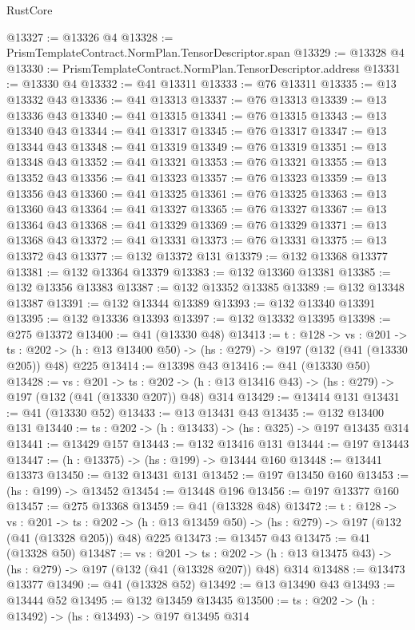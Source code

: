\begin{lexlean}{RustCore}
\begin{coremodule}
@13327 := @13326 @4
@13328 := PrismTemplateContract.NormPlan.TensorDescriptor.span
@13329 := @13328 @4
@13330 := PrismTemplateContract.NormPlan.TensorDescriptor.address
@13331 := @13330 @4
@13332 := @41 @13311
@13333 := @76 @13311
@13335 := @13 @13332 @43
@13336 := @41 @13313
@13337 := @76 @13313
@13339 := @13 @13336 @43
@13340 := @41 @13315
@13341 := @76 @13315
@13343 := @13 @13340 @43
@13344 := @41 @13317
@13345 := @76 @13317
@13347 := @13 @13344 @43
@13348 := @41 @13319
@13349 := @76 @13319
@13351 := @13 @13348 @43
@13352 := @41 @13321
@13353 := @76 @13321
@13355 := @13 @13352 @43
@13356 := @41 @13323
@13357 := @76 @13323
@13359 := @13 @13356 @43
@13360 := @41 @13325
@13361 := @76 @13325
@13363 := @13 @13360 @43
@13364 := @41 @13327
@13365 := @76 @13327
@13367 := @13 @13364 @43
@13368 := @41 @13329
@13369 := @76 @13329
@13371 := @13 @13368 @43
@13372 := @41 @13331
@13373 := @76 @13331
@13375 := @13 @13372 @43
@13377 := @132 @13372 @131
@13379 := @132 @13368 @13377
@13381 := @132 @13364 @13379
@13383 := @132 @13360 @13381
@13385 := @132 @13356 @13383
@13387 := @132 @13352 @13385
@13389 := @132 @13348 @13387
@13391 := @132 @13344 @13389
@13393 := @132 @13340 @13391
@13395 := @132 @13336 @13393
@13397 := @132 @13332 @13395
@13398 := @275 @13372
@13400 := @41 (@13330 @48)
@13413 := {t : @128} ->
  {vs : @201} ->
  {ts : @202} -> (h : @13 @13400 @50) -> (hs : @279) -> @197 (@132 (@41 (@13330 @205)) @48) @225
@13414 := @13398 @43
@13416 := @41 (@13330 @50)
@13428 := {vs : @201} ->
  {ts : @202} -> (h : @13 @13416 @43) -> (hs : @279) -> @197 (@132 (@41 (@13330 @207)) @48) @314
@13429 := @13414 @131
@13431 := @41 (@13330 @52)
@13433 := @13 @13431 @43
@13435 := @132 @13400 @131
@13440 := {ts : @202} -> (h : @13433) -> (hs : @325) -> @197 @13435 @314
@13441 := @13429 @157
@13443 := @132 @13416 @131
@13444 := @197 @13443
@13447 := (h : @13375) -> (hs : @199) -> @13444 @160
@13448 := @13441 @13373
@13450 := @132 @13431 @131
@13452 := @197 @13450 @160
@13453 := (hs : @199) -> @13452
@13454 := @13448 @196
@13456 := @197 @13377 @160
@13457 := @275 @13368
@13459 := @41 (@13328 @48)
@13472 := {t : @128} ->
  {vs : @201} ->
  {ts : @202} -> (h : @13 @13459 @50) -> (hs : @279) -> @197 (@132 (@41 (@13328 @205)) @48) @225
@13473 := @13457 @43
@13475 := @41 (@13328 @50)
@13487 := {vs : @201} ->
  {ts : @202} -> (h : @13 @13475 @43) -> (hs : @279) -> @197 (@132 (@41 (@13328 @207)) @48) @314
@13488 := @13473 @13377
@13490 := @41 (@13328 @52)
@13492 := @13 @13490 @43
@13493 := @13444 @52
@13495 := @132 @13459 @13435
@13500 := {ts : @202} -> (h : @13492) -> (hs : @13493) -> @197 @13495 @314

\end{coremodule}
\end{lexlean}
